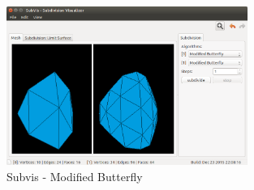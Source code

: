 \begin{figure}
  \centering
  \includegraphics[width=0.7\textwidth]{content/media/sd_modbutterfly_screenshot.png}
  \caption{Subvis - Modified Butterfly}
  \label{fig:sd_modbutterfly_screenshot}
\end{figure}














